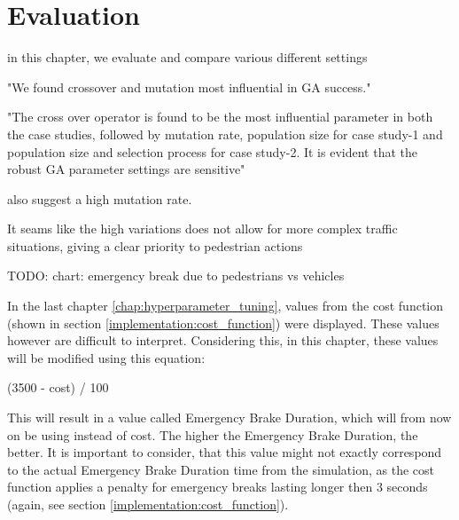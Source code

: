 \chapter{Evaluation}
\label{chap:evaluation}
in this chapter, we evaluate and compare various different settings

"We found crossover and mutation most influential in GA success."\cite{mills_determining_2015}

"The cross over operator is found to be the most influential parameter in both the case studies, followed by mutation rate, population size for case study-1 and population size and selection process for case study-2. It is evident that the robust GA parameter settings are sensitive"\cite{majumdar_genetic_2015}

\cite{boyabatli_parameter_2004} also suggest a high mutation rate.



It seams like the high variations does not allow for more complex traffic situations, giving a clear priority to pedestrian actions

TODO: chart: emergency break due to pedestrians vs vehicles


In the last chapter \ref{chap:hyperparameter_tuning}, values from the cost function (shown in section \ref{implementation:cost_function}) were displayed. These values however are difficult to interpret. Considering this, in this chapter, these values will be modified using this equation:

(3500 - cost) / 100

This will result in a value called Emergency Brake Duration, which will from now on be using instead of cost. The higher the Emergency Brake Duration, the better. It is important to consider, that this value might not exactly correspond to the actual Emergency Brake Duration time from the simulation, as the cost function applies a penalty for emergency breaks lasting longer then 3 seconds (again, see section \ref{implementation:cost_function}).


